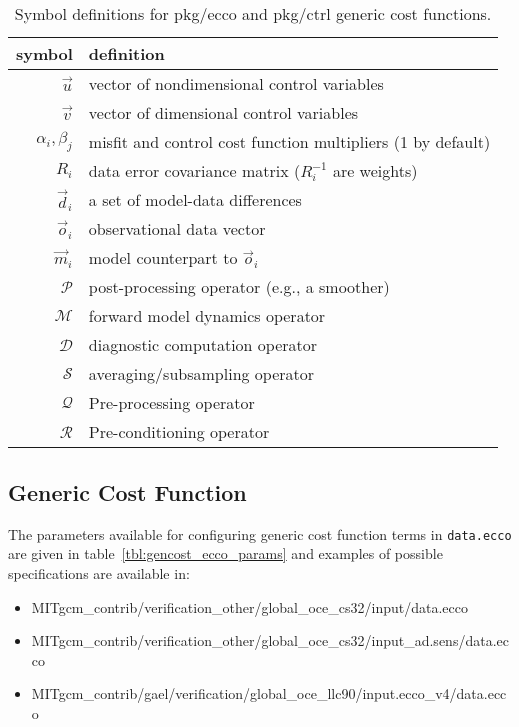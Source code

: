 \begin{table}[!ht]
\centering
\begin{tabular}{rl}
symbol			&	definition	\\ \hline
$\vec{u}$			&	vector of nondimensional control variables \\
$\vec{v}$			&	vector of dimensional control variables \\
$\alpha_i, \beta_j$	&	misfit and control cost function multipliers (1 by default) \\
$R_i$ 			&	data error covariance matrix ($R_i^{-1}$ are weights) \\
$\vec{d}_i$		&	a set of model-data differences \\
$\vec{o}_i$		&	observational data vector \\
$\vec{m}_i$		&	model counterpart to $\vec{o}_i$ \\
$\mathcal{P}$		&	post-processing operator (e.g., a smoother) \\
$\mathcal{M}$		&	forward model dynamics operator \\
$\mathcal{D}$		&	diagnostic computation operator \\
$\mathcal{S}$		&	averaging/subsampling operator \\
$\mathcal{Q}$		&	Pre-processing operator \\
$\mathcal{R}$		&	Pre-conditioning operator
\end{tabular}
\caption{Symbol definitions for pkg/ecco and pkg/ctrl generic cost functions.}
\label{tbl:gencost_symbols}
\end{table}

\subsection{Generic Cost Function} \label{costgen}

The parameters available for configuring generic cost function terms in \texttt{data.ecco} are given in table~\ref{tbl:gencost_ecco_params} and examples of possible specifications are available in:
\begin{itemize}
\itemsep0em
\item MITgcm\_contrib/verification\_other/global\_oce\_cs32/input/data.ecco
\item MITgcm\_contrib/verification\_other/global\_oce\_cs32/input\_ad.sens/data.ecco
\item MITgcm\_contrib/gael/verification/global\_oce\_llc90/input.ecco\_v4/data.ecco
\end{itemize}
 
